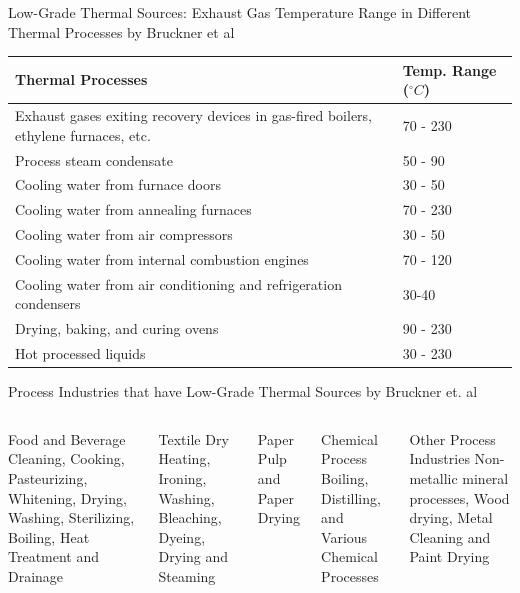 \begin{frame}{Low-Grade Thermal Sources: Exhaust Gas Temperature Range in Different  Thermal Processes by Bruckner et al\cite{bruckner2015industrial}}
    \begin{table}[]
        \centering
        \begin{tabular}{p{7.5cm}p{2.5cm}}
        \hline
        \textbf{Thermal Processes} &
        \textbf{Temp. Range ($^{\circ}C$)} \\
        \hline
     Exhaust gases exiting recovery devices in gas-fired boilers, ethylene furnaces, etc. &  70 - 230 \\
     Process steam condensate & 50 - 90 \\
     Cooling water from furnace doors & 30 - 50 \\
     Cooling water from annealing furnaces & 70 - 230 \\
     Cooling water from air compressors & 30 - 50 \\
     Cooling water from internal combustion engines & 70 - 120 \\
     Cooling water from air conditioning and refrigeration condensers & 30-40 \\
     Drying, baking, and curing ovens & 90 - 230 \\
     Hot processed liquids & 30 - 230 \\
     \hline
    \end{tabular}
    \end{table}
\end{frame}

\begin{frame}{Process Industries that have Low-Grade Thermal Sources by Bruckner et. al\cite{bruckner2015industrial}}
    \begin{columns}
		\begin{block}{Food and Beverage}
			Cleaning, Cooking, Pasteurizing, Whitening, Drying, Washing, Sterilizing, Boiling, Heat Treatment and Drainage
		\end{block}
		
		\begin{block}{Textile}
			Dry Heating, Ironing, Washing, Bleaching, Dyeing, Drying and Steaming
		\end{block}
		
		\begin{block}{Paper}
			Pulp and Paper Drying
		\end{block}
		
		\begin{block}{Chemical Process}
			Boiling, Distilling, and Various Chemical Processes
		\end{block}
		
		\begin{block}{Other Process Industries}
			Non-metallic mineral processes, Wood drying, Metal Cleaning and Paint Drying
		\end{block}
	\end{columns}
\end{frame}

